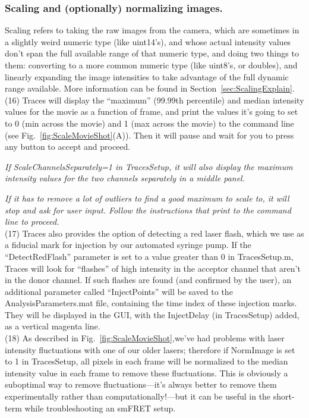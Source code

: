 \documentclass[11pt]{article}
\begin{document}
\subsubsection{Scaling and (optionally) normalizing images.}

Scaling refers to taking the raw images from the camera, which are sometimes in a slightly weird numeric type (like uint14's), and whose actual intensity values don't span the full available range of that numeric type, and doing two things to them: converting to a more common numeric type (like uint8's, or doubles), and linearly expanding the image intensities to take advantage of the full dynamic range available. More information can be found in Section~\ref{sec:ScalingExplain}.\\

\noindent (16) Traces will display the ``maximum'' (99.99th percentile) and median intensity values for the movie as a function of frame, and print the values it's going to set to 0 (min across the movie) and 1 (max across the movie) to the command line (see Fig.~\ref{fig:ScaleMovieShot}(A)).  Then it will pause and wait for you to press any button to accept and proceed.

{\it If ScaleChannelsSeparately=1 in TracesSetup, it will also display the maximum intensity values for the two channels separately in a middle panel.}  

{\it If it has to remove a lot of outliers to find a good maximum to scale to, it will stop %
and ask for user input.  Follow the instructions that print to the command line to proceed.}\\

\noindent (17) Traces also provides the option of detecting a red laser flash, which we use as a fiducial mark for injection by our automated syringe pump. If the ``DetectRedFlash'' parameter is set to a value greater than 0 in TracesSetup.m, Traces will look for ``flashes'' of high intensity in the acceptor channel that aren't in the donor channel. If such flashes are found (and confirmed by the user), an additional parameter called ``InjectPoints'' will be saved to the AnalysisParameters.mat file, containing the time index of these injection marks. They will be displayed in the GUI, with the InjectDelay (in TracesSetup) added, as a vertical magenta line.\\

\noindent (18) As described in Fig.~\ref{fig:ScaleMovieShot},we've had problems with laser intensity fluctuations with one of our older lasers; therefore if NormImage is set to 1 in TracesSetup, all pixels in each frame will be normalized to the median intensity value in each frame to remove these fluctuations. This is obviously a suboptimal way to remove fluctuations---it's always better to remove them experimentally rather than computationally!---but it can be useful in the short-term while troubleshooting an smFRET setup.
\end{document}
